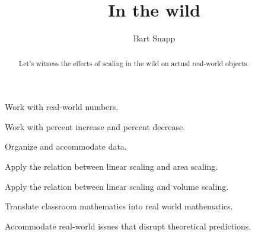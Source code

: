 \documentclass[nooutcomes,noauthor,12pt,handout]{ximera}
\title{In the wild}
\author{Bart Snapp}
\begin{document}
\begin{abstract}
  Let's witness the effects of scaling in the wild on actual
  real-world objects.
\end{abstract}
\maketitle


\begin{listOutcomes}
\item Work with real-world numbers.
\item Work with percent increase and percent decrease.
\item Organize and accommodate data.
\item Apply the relation between linear scaling and area scaling.
\item Apply the relation between linear scaling and volume scaling.
\item Translate classroom mathematics into real world mathematics. 
\item Accommodate real-world issues that disrupt theoretical predictions.
\end{listOutcomes}





\mynewpage



\end{document}
